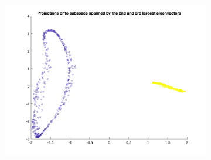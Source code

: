 \documentclass[a4paper, 11pt, one column]{article}
\begin{document}
\begin{figure}[]
\begin{subfigure}{0.33\textwidth}
            \includegraphics[width=\linewidth]{images/8.png}
        \end{subfigure}\hfil
        

\end{figure}
\end{document}
